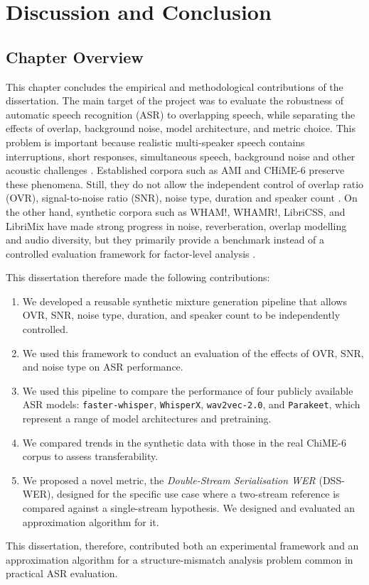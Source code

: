 \chapter{Discussion and Conclusion}
\label{chap:discussion}

\section{Chapter Overview}
This chapter concludes the empirical and methodological contributions of the dissertation. The main target of the project was to evaluate the robustness of automatic speech recognition (ASR) to overlapping speech, while separating the effects of overlap, background noise, model architecture, and metric choice. This problem is important because realistic multi-speaker speech contains interruptions, short responses, simultaneous speech, background noise and other acoustic challenges \citep{Conversation_in_small_groups, Shriberg2001ObservationsOO, cetin06_interspeech}. Established corpora such as AMI and CHiME-6 preserve these phenomena. Still, they do not allow the independent control of overlap ratio (OVR), signal-to-noise ratio (SNR), noise type, duration and speaker count \citep{ami-corpus, carletta2005ami, chime6, watanabe2020chime6challengetacklingmultispeakerspeech}. On the other hand, synthetic corpora such as WHAM!, WHAMR!, LibriCSS, and LibriMix have made strong progress in noise, reverberation, overlap modelling and audio diversity, but they primarily provide a benchmark instead of a controlled evaluation framework for factor-level analysis \citep{wichern2019whamextendingspeechseparation, maciejewski2020whamrnoisyreverberantsinglechannel, chen2020continuousspeechseparationdataset, cosentino2020librimixopensourcedatasetgeneralizable}.

This dissertation therefore made the following contributions:
\begin{enumerate}
    \item We developed a reusable synthetic mixture generation pipeline that allows OVR, SNR, noise type, duration, and speaker count to be independently controlled.
    \item We used this framework to conduct an evaluation of the effects of OVR, SNR, and noise type on ASR performance.
    \item We used this pipeline to compare the performance of four publicly available ASR models: \texttt{faster-whisper}, \texttt{WhisperX}, \texttt{wav2vec-2.0}, and \texttt{Parakeet}, which represent a range of model architectures and pretraining.
    \item We compared trends in the synthetic data with those in the real ChiME-6 corpus to assess transferability.
    \item We proposed a novel metric, the \emph{Double-Stream Serialisation WER} (DSS-WER), designed for the specific use case where a two-stream reference is compared against a single-stream hypothesis. We designed and evaluated an approximation algorithm for it. 
\end{enumerate}
This dissertation, therefore, contributed both an experimental framework and an approximation algorithm for a structure-mismatch analysis problem common in practical ASR evaluation.

